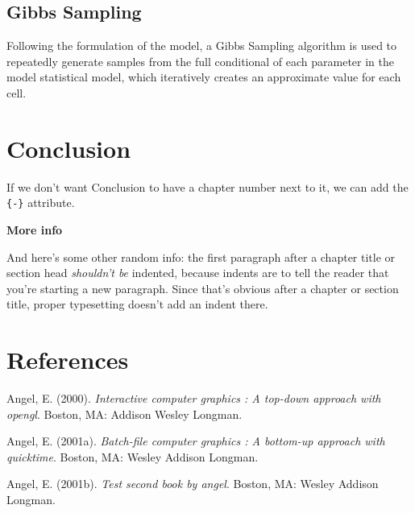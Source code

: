 \documentclass[12pt,twoside]{dukestatscithesis}
\theoremstyle{definition}
\theoremstyle{definition}
\theoremstyle{definition}
\theoremstyle{remark}
\begin{document}
\section{Gibbs Sampling}\label{gibbs-sampling-1}

Following the formulation of the model, a Gibbs Sampling algorithm is
used to repeatedly generate samples from the full conditional of each
parameter in the model statistical model, which iteratively creates an
approximate value for each cell.

\chapter*{Conclusion}\label{conclusion}

If we don't want Conclusion to have a chapter number next to it, we can
add the \texttt{\{-\}} attribute.

\textbf{More info}

And here's some other random info: the first paragraph after a chapter
title or section head \emph{shouldn't be} indented, because indents are
to tell the reader that you're starting a new paragraph. Since that's
obvious after a chapter or section title, proper typesetting doesn't add
an indent there.

\backmatter

\chapter*{References}\label{references}


\noindent

\setlength{\parindent}{-0.20in} \setlength{\leftskip}{0.20in}
\setlength{\parskip}{8pt}

\hypertarget{refs}{}
\hypertarget{ref-angel2000}{}
Angel, E. (2000). \emph{Interactive computer graphics : A top-down
approach with opengl}. Boston, MA: Addison Wesley Longman.

\hypertarget{ref-angel2001}{}
Angel, E. (2001a). \emph{Batch-file computer graphics : A bottom-up
approach with quicktime}. Boston, MA: Wesley Addison Longman.

\hypertarget{ref-angel2002a}{}
Angel, E. (2001b). \emph{Test second book by angel}. Boston, MA: Wesley
Addison Longman.


\end{document}
